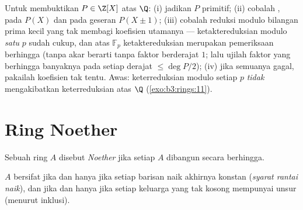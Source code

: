 \begin{method}\label{met:b3:rings:irreducibility}
Untuk membuktikan $P \in \Z[X]$  atas $\Q$: (i) jadikan $P$
primitif; (ii) cobalah , pada $P(X)$ dan pada geseran $P(X \pm
1)$; (iii) cobalah reduksi modulo bilangan prima kecil yang tak membagi
koefisien utamanya --- ketaktereduksian modulo \emph{satu} $p$
sudah cukup, dan atas $\mathbb F_p$ ketaktereduksian merupakan pemeriksaan berhingga
(tanpa akar berarti tanpa faktor berderajat $1$; lalu ujilah faktor yang berhingga
banyaknya pada setiap derajat $\leq \deg P/2$); (iv) jika semuanya gagal,
pakailah koefisien tak tentu. Awas: keterreduksian modulo setiap $p$
\emph{tidak} mengakibatkan keterreduksian atas $\Q$
(\cref{exo:b3:rings:11}).
\end{method}

\section{Ring Noether}

\begin{definition}\label{def:b3:rings:noetherian}
Sebuah ring $A$ disebut \emph{Noether} jika setiap
 $A$ dibangun secara berhingga.
\end{definition}

\begin{proposition}\label{prop:b3:rings:noethacc}
$A$ bersifat  jika dan hanya jika setiap barisan naik 
akhirnya konstan (\emph{syarat rantai naik}), dan jika dan hanya jika setiap
keluarga  yang tak kosong mempunyai unsur  (menurut inklusi).
\end{proposition}

